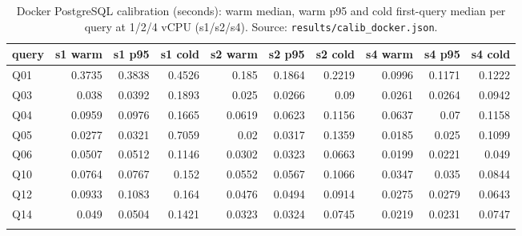 \begin{table}[htbp]
\centering
\footnotesize
\caption{Docker PostgreSQL calibration (seconds): warm median, warm p95 and cold first-query median per query at 1/2/4 vCPU (s1/s2/s4). Source: \texttt{results/calib\_docker.json}.}
\label{tab:calib}
\setlength{\tabcolsep}{3pt}
\begin{tabular}{lrrrrrrrrr}
\toprule
\textbf{query} & \textbf{s1 warm} & \textbf{s1 p95} & \textbf{s1 cold} & \textbf{s2 warm} & \textbf{s2 p95} & \textbf{s2 cold} & \textbf{s4 warm} & \textbf{s4 p95} & \textbf{s4 cold} \\
\midrule
Q01 & 0.3735 & 0.3838 & 0.4526 & 0.185 & 0.1864 & 0.2219 & 0.0996 & 0.1171 & 0.1222 \\
Q03 & 0.038 & 0.0392 & 0.1893 & 0.025 & 0.0266 & 0.09 & 0.0261 & 0.0264 & 0.0942 \\
Q04 & 0.0959 & 0.0976 & 0.1665 & 0.0619 & 0.0623 & 0.1156 & 0.0637 & 0.07 & 0.1158 \\
Q05 & 0.0277 & 0.0321 & 0.7059 & 0.02 & 0.0317 & 0.1359 & 0.0185 & 0.025 & 0.1099 \\
Q06 & 0.0507 & 0.0512 & 0.1146 & 0.0302 & 0.0323 & 0.0663 & 0.0199 & 0.0221 & 0.049 \\
Q10 & 0.0764 & 0.0767 & 0.152 & 0.0552 & 0.0567 & 0.1066 & 0.0347 & 0.035 & 0.0844 \\
Q12 & 0.0933 & 0.1083 & 0.164 & 0.0476 & 0.0494 & 0.0914 & 0.0275 & 0.0279 & 0.0643 \\
Q14 & 0.049 & 0.0504 & 0.1421 & 0.0323 & 0.0324 & 0.0745 & 0.0219 & 0.0231 & 0.0747 \\
\botrule
\end{tabular}
\end{table}
